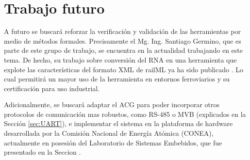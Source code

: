\section{Trabajo futuro}

A futuro se buscará reforzar la verificación y validación de las herramientas por medio de métodos formales. Precisamente el Mg. Ing. Santiago Germino, que es parte de este grupo de trabajo, se encuentra en la actualidad trabajando en este tema. De hecho, su trabajo sobre conversión del RNA en una herramienta que explote las características del formato XML de railML ya ha sido publicado \cite{Paper_207}. Lo cual permitirá un mayor uso de la herramienta en entornos ferroviarios y su certificación para uso industrial.

Adicionalmente, se buscará adaptar el ACG para poder incorporar otros protocolos de comunicación mas robustos, como RS-485 o MVB (explicados en la Sección \ref{sec:UART}), e implementar el sistema en la plataforma de hardware desarrollada por la Comisión Nacional de Energía Atómica (CONEA), actualmente en posesión del Laboratorio de Sistemas Embebidos, que fue presentado en la Seccion \label{sec:GICSAFE}.



